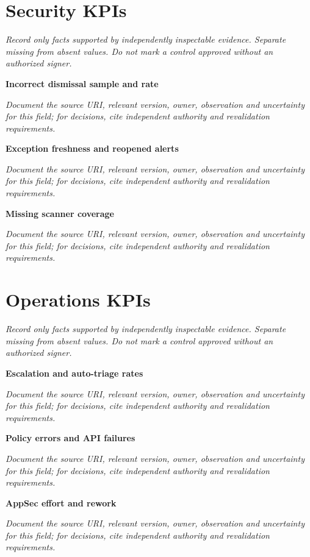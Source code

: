 \documentclass[11pt,letterpaper]{article}
\begin{document}
\section{Security KPIs}
\noindent\emph{Record only facts supported by independently inspectable evidence. Separate missing from absent values. Do not mark a control approved without an authorized signer.}\par
\noindent\textbf{Incorrect dismissal sample and rate}\par
\noindent\emph{Document the source URI, relevant version, owner, observation and uncertainty for this field; for decisions, cite independent authority and revalidation requirements.}\par\medskip
\noindent\textbf{Exception freshness and reopened alerts}\par
\noindent\emph{Document the source URI, relevant version, owner, observation and uncertainty for this field; for decisions, cite independent authority and revalidation requirements.}\par\medskip
\noindent\textbf{Missing scanner coverage}\par
\noindent\emph{Document the source URI, relevant version, owner, observation and uncertainty for this field; for decisions, cite independent authority and revalidation requirements.}\par\medskip
\section{Operations KPIs}
\noindent\emph{Record only facts supported by independently inspectable evidence. Separate missing from absent values. Do not mark a control approved without an authorized signer.}\par
\noindent\textbf{Escalation and auto-triage rates}\par
\noindent\emph{Document the source URI, relevant version, owner, observation and uncertainty for this field; for decisions, cite independent authority and revalidation requirements.}\par\medskip
\noindent\textbf{Policy errors and API failures}\par
\noindent\emph{Document the source URI, relevant version, owner, observation and uncertainty for this field; for decisions, cite independent authority and revalidation requirements.}\par\medskip
\noindent\textbf{AppSec effort and rework}\par
\noindent\emph{Document the source URI, relevant version, owner, observation and uncertainty for this field; for decisions, cite independent authority and revalidation requirements.}\par\medskip
\end{document}
